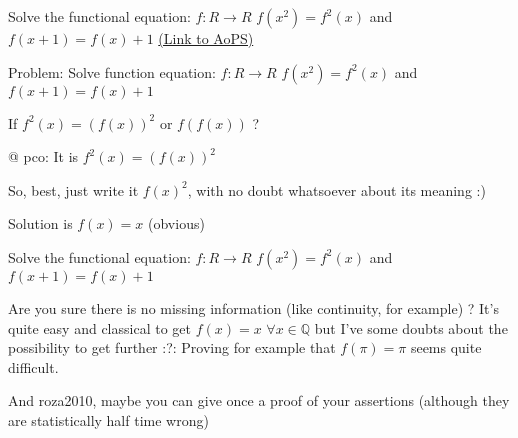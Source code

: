 \begin{problem}
	Solve the functional equation:
$f: R \to R$
$f(x^2) = f^2(x)$ 
and $f(x + 1) = f(x) + 1$
	\flushright \href{https://artofproblemsolving.com/community/c6h481766}{(Link to AoPS)}
\end{problem}



\begin{solution}
	\begin{tcolorbox}Problem: Solve function equation:
$f: R \to R$
$f(x^2) = f^2(x)$ 
and $f(x + 1) = f(x) + 1$\end{tcolorbox}
If $f^2(x)=(f(x))^2$ or $f(f(x))$ ?
\end{solution}



\begin{solution}
	@ pco: It is  $f^2(x)=(f(x))^2$
\end{solution}



\begin{solution}
	So, best, just write it $f(x)^2$, with no doubt whatsoever about its meaning :)
\end{solution}



\begin{solution}
	Solution is $f(x)=x$ (obvious)
\end{solution}



\begin{solution}
	\begin{tcolorbox}Solve the functional equation:
$f: R \to R$
$f(x^2) = f^2(x)$ 
and $f(x + 1) = f(x) + 1$\end{tcolorbox}
Are you sure there is no missing information (like continuity, for example) ?
It's quite easy and classical to get $f(x)=x$ $\forall x\in\mathbb Q$ but I've some doubts about the possibility to get further :?:
Proving for example that $f(\pi)=\pi$ seems quite difficult.

And roza2010, maybe you can give once a proof of your assertions (although they are statistically half time wrong)
\end{solution}



